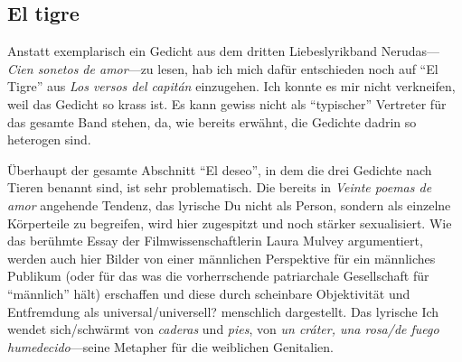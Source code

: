 \begin{comment}
  ** Laurie Penny: "Man kann die Suche nach einer einfachen Bindung zu einem elenden, ermüdenden RItual machen, das eine strenge Geschlechtskonformität voraussetzt und den menschlichen Geist unterdrückt."
  ** Laurie Penny: "Frauen aller Gesellschaftsschichten wird beigebracht, dass sie sich zuallererst um die Liebe von Männern bemühen müssen, um darüber ihren Wert zu taxieren, Männer auf sich aufmerksam zu machen. Und in allen Gesellschaftsschichten wird die romantische Demütigung dafür genutzt, Frauen klein zu machen. Jeder heterosexuelle Mann, mit dem ich mich je über Partnersuche unterhalten habe, dass Frauen in romantischen Dingen alle Macht haben, auch die ultimative Macht, auf die sexuelle Avancen eines Mannes einzugehen oder sie zurückzuweisen und einen Mann in den Kreis ihrer "Freunde" einzureihen, was dieser als völlig schwachsinnig empfindet, denn natürlich will kein echter Mann für eine Frau nur ein Freund sein. Die Macht, nein zum Sex zu sagen, finden Männer ungeheuerlich und erachten es daher nur als gerecht, dass Frauen und Mädchen alle anderen Spielarten der Macht seit vielen trostlosen Generationen vorenthalten werden. Das hätte etwas für sich, wenn die Macht, nein zum Sex zu sagen, in der Praxis respektiert würde." (S.225)

\end{comment}

\subsection{El tigre}

Anstatt exemplarisch ein Gedicht aus dem dritten Liebeslyrikband Nerudas—\textit{Cien sonetos de amor}—zu lesen, hab ich mich dafür entschieden noch auf ``El Tigre'' aus \textit{Los versos del capitán} einzugehen.
Ich konnte es mir nicht verkneifen, weil das Gedicht so krass ist.
Es kann gewiss nicht als ``typischer'' Vertreter für das gesamte Band stehen, da, wie bereits erwähnt, die Gedichte dadrin so heterogen sind.

Überhaupt der gesamte Abschnitt ``El deseo'', in dem die drei Gedichte nach Tieren benannt sind, ist sehr problematisch.
Die bereits in \textit{Veinte poemas de amor} angehende Tendenz, das lyrische Du nicht als Person, sondern als einzelne Körperteile zu begreifen, wird hier zugespitzt und noch stärker sexualisiert.
Wie das berühmte Essay der Filmwissenschaftlerin Laura Mulvey argumentiert, werden auch hier Bilder von einer männlichen Perspektive für ein männliches Publikum (oder für das was die vorherrschende patriarchale Gesellschaft für ``männlich'' hält) erschaffen und diese durch scheinbare Objektivität und Entfremdung als universal/universell? menschlich dargestellt.
Das lyrische Ich wendet sich/schwärmt von \textit{caderas} und \textit{pies}, von \textit{un cráter, una rosa/de fuego humedecido}—seine Metapher für die weiblichen Genitalien.

